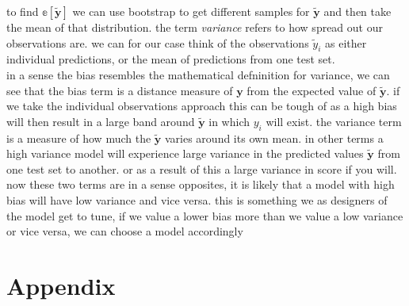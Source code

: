 \documentclass[twoside,11pt]{report}
\begin{document}
to find $\mathbb{e}[\mathbf{\tilde{y}}]$ we can use bootstrap to get different samples for $\mathbf{\tilde{y}}$ and then take the mean of that distribution.
the term \emph{variance} refers to how spread out our observations are. we can for our case think of the observations $\tilde{y}_i$
as either individual predictions, or the mean of predictions from one test set.\\
in a sense the bias resembles the mathematical defninition for variance, we can see that the bias term is a distance measure of $\mathbf{y}$ from the expected value of $\mathbf{\tilde{y}}$. if we take the individual observations approach this can be tough of as a high bias will then result in a large band around $\mathbf{\tilde{y}}$ in which $y_i$ will exist. the variance term is a measure of how much the $\mathbf{\tilde{y}}$ varies around its own mean. in other terms a high variance model will experience large variance in the predicted values $\mathbf{\tilde{y}}$ from one test set to another. or as a result of this a large variance in score if you will. now these two terms are in a sense opposites, it is likely that a model with high bias will have low variance and vice versa. this is something we as designers of the model get to tune, if we value a lower bias more than we value a low variance or vice versa, we can choose a model accordingly










































%
%
\newpage
\appendix
{}%
\section*{Appendix}
\label{app:appendix}
\end{document}
